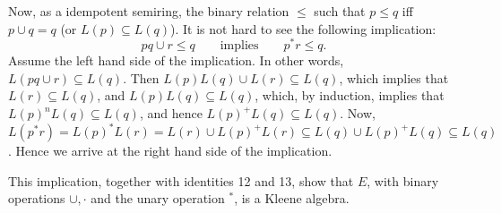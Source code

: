 \documentclass[12pt]{article}
\begin{document}
Now, as a idempotent semiring, the binary relation $\le$ such that $p\le q$ iff $p\cup q=q$ (or $L(p)\subseteq L(q)$).  It is not hard to see the following implication:
\begin{equation}
pq\cup r\le q \qquad \mbox{implies} \qquad p^*r \le q.
\end{equation}
Assume the left hand side of the implication.  In other words, $L(pq\cup r)\subseteq L(q)$.  Then $L(p)L(q)\cup L(r)\subseteq L(q)$, which implies that $L(r)\subseteq L(q)$, and $L(p)L(q)\subseteq L(q)$, which, by induction, implies that $L(p)^n L(q)\subseteq L(q)$, and hence $L(p)^+ L(q)\subseteq L(q)$.  Now, $L(p^*r)=L(p)^*L(r)=L(r)\cup L(p)^+L(r) \subseteq L(q)\cup L(p)^+L(q)\subseteq L(q)$.  Hence we arrive at the right hand side of the implication.

This implication, together with identities 12 and 13, show that $E$, with binary operations $\cup,\cdot$ and the unary operation $^*$, is a Kleene algebra.
\end{document}
